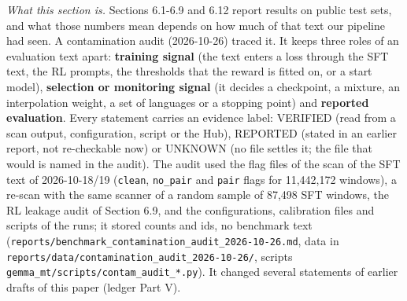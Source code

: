 \emph{What this section is.} Sections 6.1-6.9 and 6.12 report results on public test sets, and what those numbers mean depends on how much of that text our pipeline had seen. A contamination audit (2026-10-26) traced it. It keeps three roles of an evaluation text apart: \textbf{training signal} (the text enters a loss through the SFT text, the RL prompts, the thresholds that the reward is fitted on, or a start model), \textbf{selection or monitoring signal} (it decides a checkpoint, a mixture, an interpolation weight, a set of languages or a stopping point) and \textbf{reported evaluation}. Every statement carries an evidence label: VERIFIED (read from a scan output, configuration, script or the Hub), REPORTED (stated in an earlier report, not re-checkable now) or UNKNOWN (no file settles it; the file that would is named in the audit). The audit used the flag files of the scan of the SFT text of 2026-10-18/19 (\texttt{clean}, \texttt{no\_pair} and \texttt{pair} flags for 11,442,172 windows), a re-scan with the same scanner of a random sample of 87,498 SFT windows, the RL leakage audit of Section 6.9, and the configurations, calibration files and scripts of the runs; it stored counts and ids, no benchmark text (\texttt{reports/benchmark\_contamination\_audit\_2026-10-26.md}, data in \texttt{reports/data/contamination\_audit\_2026-10-26/}, scripts \texttt{gemma\_mt/scripts/contam\_audit\_*.py}). It changed several statements of earlier drafts of this paper (ledger Part V).

